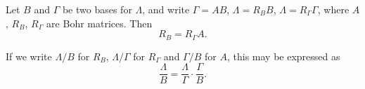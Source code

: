 Let $B$ and $\Gamma$ be two bases for $\Lambda$, and write $\Gamma = AB$, $\Lambda = R_B B$, $\Lambda = R_\Gamma \Gamma$, where $A$, $R_B$, $R_\Gamma$ are Bohr matrices. Then
$$R_B = R_\Gamma A.$$

If we write $\Lambda/B$ for $R_B$, $\Lambda/\Gamma$ for $R_\Gamma$ and $\Gamma/B$ for $A$, this may be expressed as
$$\frac{\Lambda}{B} = \frac{\Lambda}{\Gamma} \cdot \frac{\Gamma}{B}.$$
